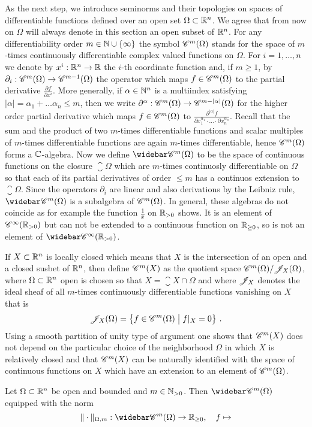 \para
As the next step, we introduce seminorms and their topologies on spaces of differentiable functions defined over an
open set $\Omega\subset\mathbb{R}^n$. We agree that from now on $\Omega$ will always  denote in this section an open subset
of $\mathbb{R}^n$. For any differentiability order $m\in \mathbb{N} \cup \{ \infty\}$
the symbol $\mathscr{C}^m (\Omega)$ stands for the space of $m$-times continuously differentiable complex valued
functions on $\Omega$. For $i=1,\ldots,n$ we denote by $x^i : \mathbb{R}^n \to \mathbb{R}$  the $i$-th coordinate function
and, if $m\geq 1$, by $\partial_i : \mathscr{C}^{m} (\Omega) \to \mathscr{C}^{m-1} (\Omega)$
the operator which maps $f \in \mathscr{C}^m (\Omega)$ to the partial derivative
$\frac{\partial f}{\partial x^i}$. More generally, if $\alpha \in \mathbb{N}^n$ is a multiindex satisfying
$|\alpha| = \alpha_1+\ldots \alpha_n \leq m$, then we write
$\partial^\alpha : \mathscr{C}^{m} (\Omega) \to \mathscr{C}^{m-|\alpha|} (\Omega)$  for the higher order partial derivative
which maps $f \in \mathscr{C}^{m} (\Omega)$ to
$\frac{\partial^{|\alpha|} f}{\partial x_1^{\alpha_1} \cdot \ldots \cdot \partial x_n^{\alpha_n}}$. Recall that the
sum and the product of two $m$-times differentiable functions and scalar multiples of  $m$-times differentiable functions
are again $m$-times differentiable, hence $\mathscr{C}^{m} (\Omega)$ forms a $\mathbb{C}$-algebra.
Now we define $\shDiffExtFcts{m} (\Omega)$ to be the space of continuous functions on the closure $\closure{\Omega}$
which are $m$-times continuosly differentiable on $\Omega$ so that each of its partial derivatives of order $\leq m$
has a continuos extension to $\closure{\Omega}$. Since the operators  $\partial_i$ are linear and also derivations
by the Leibniz rule,  $\shDiffExtFcts{m} (\Omega)$ is a subalgebra of $\mathscr{C}^{m} (\Omega)$. In general, these
algebras do not coincide as for example the function $\frac 1x$ on $\mathbb{R}_{>0}$ shows. It is an element
of $\mathscr{C}^{\infty} (\mathbb{R}_{>0})$ but can not be extended to  a continuous function on $\mathbb{R}_{\geq 0}$,
so is not an element of $\shDiffExtFcts{\infty} (\R_{>0})$.

If $X \subset \mathbb{R}^n$ is locally closed which means that $X$ is the intersection of an open and a closed susbet of $\mathbb{R}^n$,
then  define $\mathscr{C}^{m} (X)$ as the quotient space $\mathscr{C}^{m} (\Omega) / \mathscr{J}_{X} (\Omega)$, where
$\Omega \subset \mathbb{R}^n$ open is chosen so that $X = \closure{X} \cap \Omega$ and where
$\mathscr{J}_{X}$ denotes the ideal sheaf of all $m$-times continuously differentiable functions
vanishing on $X$ that is
\[
   \mathscr{J}_{X} (\Omega) = \big\{ f \in \mathscr{C}^{m} (\Omega)  \bigm\vert f|_X = 0 \big\}  \ .
\]
Using a smooth partition of unity type of argument one shows that  $\mathscr{C}^{m} (X)$ does not depend on the particular
choice of the neighborhood $\Omega$ in which $X$ is relatively closed and that $\mathscr{C}^{m} (X)$ can be naturally
identified with the space of continuous functions on $X$ which have an extension to an element of
$\mathscr{C}^{m} (\Omega)$.  

\begin{proposition}
  Let $\Omega \subset \mathbb{R}^n$ be open and bounded and $m\in \mathbb{N}_{> 0}$. Then  $\shDiffExtFcts{m} (\Omega)$
  equipped with the norm
  \[
    \| \cdot \|_{\Omega,m} : \shDiffExtFcts{m} (\Omega) \to \R_{\geq 0}, \quad
    f \mapsto 
  \]
  
  
\end{proposition}